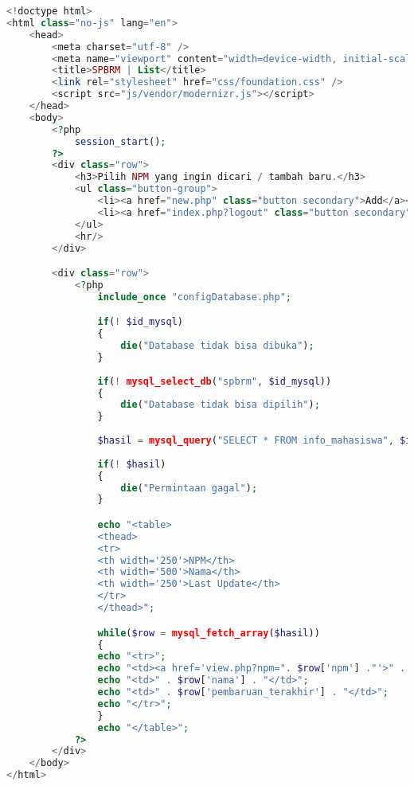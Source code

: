 \begin{lstlisting}[language=php,basicstyle=\tiny,caption=list.php]
<!doctype html>
<html class="no-js" lang="en">
	<head>
		<meta charset="utf-8" />
		<meta name="viewport" content="width=device-width, initial-scale=1.0" />
		<title>SPBRM | List</title>
		<link rel="stylesheet" href="css/foundation.css" />
		<script src="js/vendor/modernizr.js"></script>
	</head>
	<body>
		<?php
			session_start();
		?>
		<div class="row">
			<h3>Pilih NPM yang ingin dicari / tambah baru.</h3>
			<ul class="button-group">
				<li><a href="new.php" class="button secondary">Add</a></li>
				<li><a href="index.php?logout" class="button secondary">Logout</a></li>
			</ul>
			<hr/>
		</div>

		<div class="row">
			<?php
				include_once "configDatabase.php";

				if(! $id_mysql)
				{
					die("Database tidak bisa dibuka");
				}
					
				if(! mysql_select_db("spbrm", $id_mysql))
				{
					die("Database tidak bisa dipilih");
				}
			
				$hasil = mysql_query("SELECT * FROM info_mahasiswa", $id_mysql);
				
				if(! $hasil)
				{
					die("Permintaan gagal");
				}

				echo "<table>
				<thead>
				<tr>
				<th width='250'>NPM</th>
				<th width='500'>Nama</th>
				<th width='250'>Last Update</th>
				</tr>
				</thead>";

				while($row = mysql_fetch_array($hasil))
				{
				echo "<tr>";
				echo "<td><a href='view.php?npm=". $row['npm'] ."'>" . $row['npm'] . "</a></td>";
				echo "<td>" . $row['nama'] . "</td>";
				echo "<td>" . $row['pembaruan_terakhir'] . "</td>";
				echo "</tr>";
				}
				echo "</table>";
			?> 
		</div>
	</body>
</html>
\end{lstlisting}

